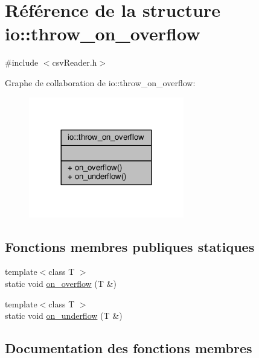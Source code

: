 \hypertarget{structio_1_1throw__on__overflow}{}\section{Référence de la structure io\+:\+:throw\+\_\+on\+\_\+overflow}
\label{structio_1_1throw__on__overflow}


{\ttfamily \#include $<$csv\+Reader.\+h$>$}



Graphe de collaboration de io\+:\+:throw\+\_\+on\+\_\+overflow\+:
\nopagebreak
\begin{figure}[H]
\begin{center}
\leavevmode
\includegraphics[width=192pt]{structio_1_1throw__on__overflow__coll__graph}
\end{center}
\end{figure}
\subsection*{Fonctions membres publiques statiques}
\begin{DoxyCompactItemize}
\item 
{\footnotesize template$<$class T $>$ }\\static void \hyperlink{structio_1_1throw__on__overflow_a0a59c1dc2ead1a9275c62885ec7545d2}{on\+\_\+overflow} (T \&)
\item 
{\footnotesize template$<$class T $>$ }\\static void \hyperlink{structio_1_1throw__on__overflow_a2ae91b1ae3d655c16f7e6a7e9a1abd92}{on\+\_\+underflow} (T \&)
\end{DoxyCompactItemize}


\subsection{Documentation des fonctions membres}
\mbox{\label{structio_1_1throw__on__overflow_a0a59c1dc2ead1a9275c62885ec7545d2}} 
